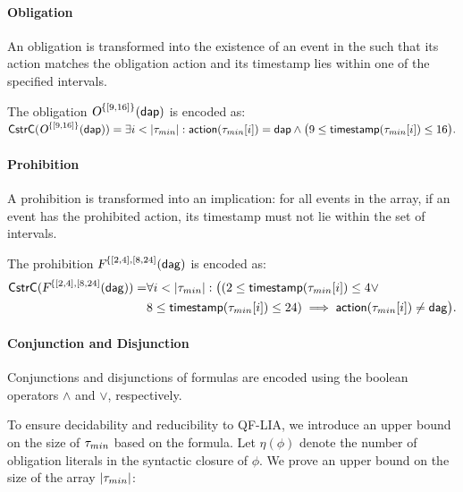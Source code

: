 \paragraph{Obligation} An obligation is transformed into the existence of an event in the \timedword such that its action matches the obligation action and its timestamp lies within one of the specified intervals.

\begin{example}
    The obligation $\textsl{O}^{\{[9,16]\}}(\mathsf{\mathsf{dap}})$ is encoded as:\\
    
    $\mathsf{CstrC}(\textsl{O}^{\{[9,16]\}}(\mathsf{\mathsf{dap}}))= \exists i < \vert \tau_{min}\vert : {\mathsf{action}}(\tau_{min}[i]) = \mathsf{dap} \wedge \big(9\leq {\ensuremath{\mathsf{timestamp}}}(\tau_{min}[i]) \leq 16\big).$
    
\end{example}

\paragraph{Prohibition} A prohibition is transformed into an implication: for all events in the array, if an event has the prohibited action, its timestamp must not lie within the set of intervals. 

\begin{example}
 The prohibition $\textsl{F}^{\{[2,4],[8,24]}(\mathsf{\mathsf{dag}})$ is encoded as:
    \begin{align*}
    \mathsf{CstrC}(\textsl{F}^{\{[2,4],[8,24]}(\mathsf{\mathsf{dag}}))=&\forall i < \vert \tau_{min}\vert: \big((2 \leq{\ensuremath{\mathsf{timestamp}}}(\tau_{min}[i]) \leq 4 \vee \\& 8 \leq {\ensuremath{\mathsf{timestamp}}}(\tau_{min}[i]) \leq 24 )
     \implies {\ensuremath{\mathsf{action}}}(\tau_{min}[i]) \neq \mathsf{dag}\big).
    \end{align*}
\end{example}



\paragraph{Conjunction and Disjunction} Conjunctions and disjunctions of formulas are encoded using the boolean operators $\wedge$ and $\vee$, respectively.

To ensure decidability and reducibility to QF-LIA, we introduce an upper bound on the size of $\tau_{min}$ based on the formula. Let $\eta(\phi)$ denote the number of obligation literals in the syntactic closure of $\phi$. 
 We prove an upper bound on the size of the array $\vert \tau_{min}\vert$:



